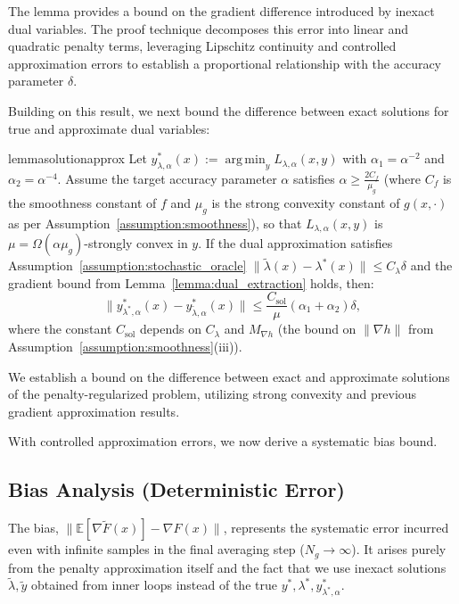 \documentclass[letterpaper]{article} %
\newcommand{\1}{\mathbf{1}}
\begin{document}
The lemma provides a bound on the gradient difference introduced by inexact dual variables. The proof technique decomposes this error into linear and quadratic penalty terms, leveraging Lipschitz continuity and controlled approximation errors to establish a proportional relationship with the accuracy parameter $\delta$.



Building on this result, we next bound the difference between exact solutions for true and approximate dual variables:
\begin{restatable}{lemma}{solutionapprox}
\label{lemma:solution_approx}
Let $y^*_{\lambda,\alpha}(x) := \operatorname*{arg\,min}_{y} L_{\lambda,\alpha}(x,y)$ with $\alpha_1=\alpha^{-2}$ and $\alpha_2=\alpha^{-4}$. Assume the target accuracy parameter $\alpha$ satisfies $\alpha \geq \frac{2 C_f}{\mu_g}$ (where $C_f$ is the smoothness constant of $f$ and $\mu_g$ is the strong convexity constant of $g(x,\cdot)$ as per Assumption~\ref{assumption:smoothness}), so that $L_{\lambda,\alpha}(x,y)$ is $\mu = \Omega(\alpha\mu_g)$-strongly convex in $y$. If the dual approximation satisfies Assumption~\ref{assumption:stochastic_oracle} $\|\tilde{\lambda}(x)-\lambda^*(x)\|\le C_\lambda\delta$ and the gradient bound from Lemma~\ref{lemma:dual_extraction} holds, then:
\[
\|y^*_{\lambda^*,\alpha}(x) - y^*_{\tilde{\lambda},\alpha}(x)\| \leq \frac{C_{\text{sol}}}{\mu}(\alpha_1 + \alpha_2)\delta,
\]
where the constant $C_{\text{sol}}$ depends on $C_\lambda$ and $M_{\nabla h}$ (the bound on $\|\nabla h\|$ from Assumption~\ref{assumption:smoothness}(iii)).
\end{restatable}

We establish a bound on the difference between exact and approximate solutions of the penalty-regularized problem, utilizing strong convexity and previous gradient approximation results.

With controlled approximation errors, we now derive a systematic bias bound.
\subsection{Bias Analysis (Deterministic Error)}

The bias, $\|\mathbb{E}[\nabla\tilde{F}(x)] - \nabla F(x)\|$, represents the systematic error incurred even with infinite samples in the final averaging step ($N_g \to \infty$). It arises purely from the penalty approximation itself and the fact that we use inexact solutions $\tilde{\lambda}, \tilde{y}$ obtained from inner loops instead of the true $y^*, \lambda^*, y^*_{\lambda^*,\alpha}$.
\end{document}
